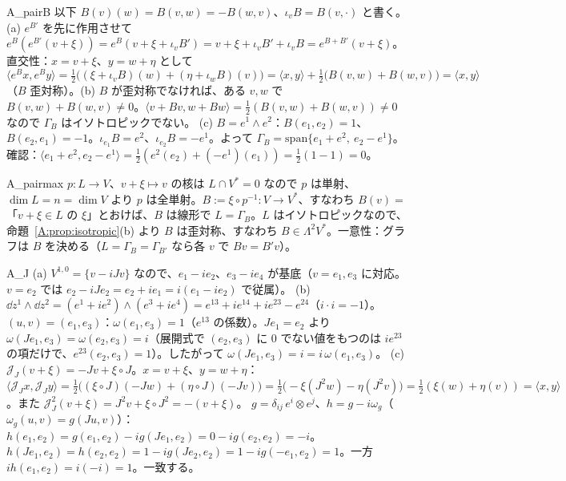 \begin{soll}{A_pairB}
以下 $B(v)(w)=B(v,w)=-B(w,v)$、$\iota_vB=B(v,\cdot)$ と書く。(a) $e^{B'}$ を先に作用させて $e^B(e^{B'}(v+\xi))=e^B(v+\xi+\iota_vB')=v+\xi+\iota_vB'+\iota_vB=e^{B+B'}(v+\xi)$。直交性：$x=v+\xi$、$y=w+\eta$ として
\[
\langle e^Bx,e^By\rangle=\tfrac12\bigl((\xi+\iota_vB)(w)+(\eta+\iota_wB)(v)\bigr)=\langle x,y\rangle+\tfrac12\bigl(B(v,w)+B(w,v)\bigr)=\langle x,y\rangle
\]
（$B$ 歪対称）。(b) $B$ が歪対称でなければ、ある $v,w$ で $B(v,w)+B(w,v)\ne0$。$\langle v+Bv,w+Bw\rangle=\frac12(B(v,w)+B(w,v))\ne0$ なので $\Gamma_B$ はイソトロピックでない。
(c) $B=e^1\wedge e^2$：$B(e_1,e_2)=1$、$B(e_2,e_1)=-1$。$\iota_{e_1}B=e^2$、$\iota_{e_2}B=-e^1$。よって $\Gamma_B=\mathrm{span}\{e_1+e^2,\ e_2-e^1\}$。確認：$\langle e_1+e^2,e_2-e^1\rangle=\frac12(e^2(e_2)+(-e^1)(e_1))=\frac12(1-1)=0$。
\end{soll}

\begin{soll}{A_pairmax}
$p:L\to V$、$v+\xi\mapsto v$ の核は $L\cap V^*=0$ なので $p$ は単射、$\dim L=n=\dim V$ より $p$ は全単射。$B:=\xi\circ p^{-1}:V\to V^*$、すなわち $B(v)=$ 「$v+\xi\in L$ の $\xi$」とおけば、$B$ は線形で $L=\Gamma_B$。$L$ はイソトロピックなので、命題~\ref{A:prop:isotropic}(b) より $B$ は歪対称、すなわち $B\in\Lambda^2V^*$。一意性：グラフは $B$ を決める（$L=\Gamma_B=\Gamma_{B'}$ なら各 $v$ で $Bv=B'v$）。
\end{soll}

\begin{soll}{A_J}
(a) $V^{1,0}=\{v-iJv\}$ なので、$e_1-ie_2$、$e_3-ie_4$ が基底（$v=e_1,e_3$ に対応。$v=e_2$ では $e_2-iJe_2=e_2+ie_1=i(e_1-ie_2)$ で従属）。
(b) $\dd z^1\wedge\dd z^2=(e^1+ie^2)\wedge(e^3+ie^4)=e^{13}+ie^{14}+ie^{23}-e^{24}$（$i\cdot i=-1$）。$(u,v)=(e_1,e_3)$：$\omega(e_1,e_3)=1$（$e^{13}$ の係数）。$Je_1=e_2$ より $\omega(Je_1,e_3)=\omega(e_2,e_3)=i$（展開式で $(e_2,e_3)$ に $0$ でない値をもつのは $ie^{23}$ の項だけで、$e^{23}(e_2,e_3)=1$）。したがって $\omega(Je_1,e_3)=i=i\,\omega(e_1,e_3)$。
(c) $\mathcal J_J(v+\xi)=-Jv+\xi\circ J$。$x=v+\xi$、$y=w+\eta$：
$\langle\mathcal J_Jx,\mathcal J_Jy\rangle=\frac12\bigl((\xi\circ J)(-Jw)+(\eta\circ J)(-Jv)\bigr)=\frac12\bigl(-\xi(J^2w)-\eta(J^2v)\bigr)=\frac12(\xi(w)+\eta(v))=\langle x,y\rangle$。また $\mathcal J_J^2(v+\xi)=J^2v+\xi\circ J^2=-(v+\xi)$。
$g=\delta_{ij}\,e^i\otimes e^j$、$h=g-i\omega_g$（$\omega_g(u,v)=g(Ju,v)$）：$h(e_1,e_2)=g(e_1,e_2)-ig(Je_1,e_2)=0-ig(e_2,e_2)=-i$。$h(Je_1,e_2)=h(e_2,e_2)=1-ig(Je_2,e_2)=1-ig(-e_1,e_2)=1$。一方 $ih(e_1,e_2)=i(-i)=1$。一致する。
\end{soll}


